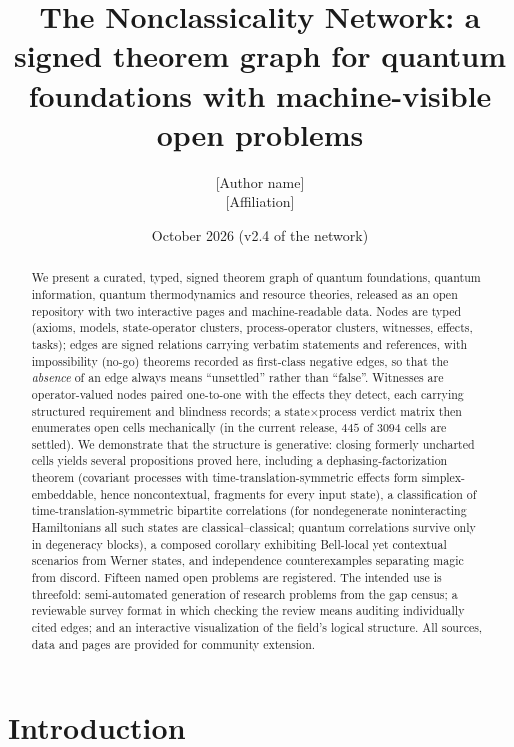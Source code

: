 \documentclass[11pt,a4paper]{article}
\title{The Nonclassicality Network: a signed theorem graph for quantum
foundations with machine-visible open problems}
\author{[Author name]\\ \small [Affiliation] \quad [email]}
\date{October 2026 \quad (v2.4 of the network)}
\theoremstyle{definition}
\begin{document}
\maketitle

\begin{abstract}
We present a curated, typed, signed theorem graph of quantum foundations,
quantum information, quantum thermodynamics and resource theories, released as
an open repository with two interactive pages and machine-readable data. Nodes
are typed (axioms, models, state-operator clusters, process-operator clusters,
witnesses, effects, tasks); edges are signed relations carrying verbatim
statements and references, with impossibility (no-go) theorems recorded as
first-class negative edges, so that the \emph{absence} of an edge always means
``unsettled'' rather than ``false''. Witnesses are operator-valued nodes paired
one-to-one with the effects they detect, each carrying structured requirement
and blindness records; a state$\times$process verdict matrix then enumerates
open cells mechanically (in the current release, $445$ of $3094$ cells are
settled). We demonstrate that the structure is generative: closing formerly
uncharted cells yields several propositions proved here, including a
dephasing-factorization theorem (covariant processes with time-translation-symmetric
effects form simplex-embeddable, hence noncontextual, fragments for every input
state), a classification of time-translation-symmetric bipartite correlations
(for nondegenerate noninteracting Hamiltonians all such states are
classical--classical; quantum correlations survive only in degeneracy blocks),
a composed corollary exhibiting Bell-local yet contextual scenarios from
Werner states, and independence counterexamples separating magic from discord.
Fifteen named open problems are registered. The intended use is threefold:
semi-automated generation of research problems from the gap census; a
reviewable survey format in which checking the review means auditing
individually cited edges; and an interactive visualization of the field's
logical structure. All sources, data and pages are provided for community
extension.
\end{abstract}

\section{Introduction}
\end{document}
